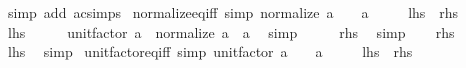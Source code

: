 \begin{isabellebody}
\ {\isacharparenleft}{\kern0pt}simp\ add{\isacharcolon}{\kern0pt}\ ac{\isacharunderscore}{\kern0pt}simps{\isacharparenright}{\kern0pt}%
\endisatagproof
{\isafoldproof}%
%
\isadelimproof
\isanewline
%
\endisadelimproof
\isanewline
{}\isamarkupfalse%
\ normalize{\isacharunderscore}{\kern0pt}eq{\isacharunderscore}{\kern0pt}{}{\isacharunderscore}{\kern0pt}iff\ {\isacharbrackleft}{\kern0pt}simp{\isacharbrackright}{\kern0pt}{\isacharcolon}{\kern0pt}\ {\isachardoublequoteopen}normalize\ a\ {\isacharequal}{\kern0pt}\ {}\ {\isasymlongleftrightarrow}\ a\ {\isacharequal}{\kern0pt}\ {}{\isachardoublequoteclose}\isanewline
\ \ {\isacharparenleft}{\kern0pt}\ {\isachardoublequoteopen}{\isacharquery}{\kern0pt}lhs\ {\isasymlongleftrightarrow}\ {\isacharquery}{\kern0pt}rhs{\isachardoublequoteclose}{\isacharparenright}{\kern0pt}\isanewline
%
\isadelimproof
%
\endisadelimproof
%
\isatagproof
{}\isamarkupfalse%
\isanewline
\ \ \isamarkupfalse%
\ {\isacharquery}{\kern0pt}lhs\isanewline
\ \ \isamarkupfalse%
\ \isamarkupfalse%
\ {\isachardoublequoteopen}unit{\isacharunderscore}{\kern0pt}factor\ a\ {\isacharasterisk}{\kern0pt}\ normalize\ a\ {\isacharequal}{\kern0pt}\ a{\isachardoublequoteclose}\ \isamarkupfalse%
\ simp\isanewline
\ \ \isamarkupfalse%
\ \isamarkupfalse%
\ {\isacharquery}{\kern0pt}rhs\ \isamarkupfalse%
\ simp\isanewline
{}\isamarkupfalse%
\isanewline
\ \ \isamarkupfalse%
\ {\isacharquery}{\kern0pt}rhs\isanewline
\ \ \isamarkupfalse%
\ \isamarkupfalse%
\ {\isacharquery}{\kern0pt}lhs\ \isamarkupfalse%
\ simp\isanewline
{}\isamarkupfalse%
%
\endisatagproof
{\isafoldproof}%
%
\isadelimproof
\isanewline
%
\endisadelimproof
\isanewline
{}\isamarkupfalse%
\ unit{\isacharunderscore}{\kern0pt}factor{\isacharunderscore}{\kern0pt}eq{\isacharunderscore}{\kern0pt}{}{\isacharunderscore}{\kern0pt}iff\ {\isacharbrackleft}{\kern0pt}simp{\isacharbrackright}{\kern0pt}{\isacharcolon}{\kern0pt}\ {\isachardoublequoteopen}unit{\isacharunderscore}{\kern0pt}factor\ a\ {\isacharequal}{\kern0pt}\ {}\ {\isasymlongleftrightarrow}\ a\ {\isacharequal}{\kern0pt}\ {}{\isachardoublequoteclose}\isanewline
\ \ {\isacharparenleft}{\kern0pt}\ {\isachardoublequoteopen}{\isacharquery}{\kern0pt}lhs\ {\isasymlongleftrightarrow}\ {\isacharquery}{\kern0pt}rhs{\isachardoublequoteclose}{\isacharparenright}{\kern0pt}\isanewline

\end{isabellebody}
